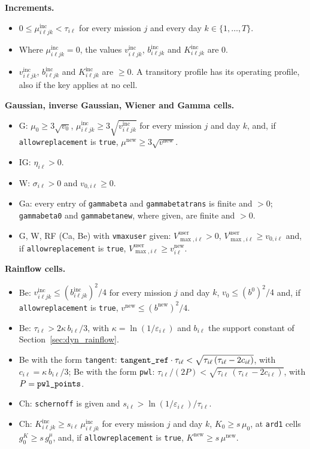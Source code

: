 \documentclass[11pt,a4paper]{article}
\theoremstyle{plain}
\theoremstyle{definition}
\newcommand{\inc}{\mathrm{inc}}
\newcommand{\new}{\mathrm{new}}
\renewcommand{\_}{\textunderscore\allowbreak{}}
\begin{document}
\textbf{Increments.}
\begin{itemize}[leftmargin=1.5em]
  \item $0 \le \mu^{\inc}_{i\ell jk} < \tau_{i\ell}$ for every mission $j$ and every day $k \in \{1,\ldots,T\}$.
  \item Where $\mu^{\inc}_{i\ell jk} = 0$, the values $v^{\inc}_{i\ell jk}$, $b^{\inc}_{i\ell jk}$ and $K^{\inc}_{i\ell jk}$ are $0$.
  \item $v^{\inc}_{i\ell jk}$, $b^{\inc}_{i\ell jk}$ and $K^{\inc}_{i\ell jk}$ are $\ge 0$. A transitory profile has its operating profile, also if the key applies at no cell.
\end{itemize}

\textbf{Gaussian, inverse Gaussian, Wiener and Gamma cells.}
\begin{itemize}[leftmargin=1.5em]
  \item G: $\mu_0 \ge 3\sqrt{v_0}$, $\mu^{\inc}_{i\ell jk} \ge 3\sqrt{v^{\inc}_{i\ell jk}}$ for every mission $j$ and day $k$, and, if \texttt{allow\_replacement} is \texttt{true}, $\mu^{\new} \ge 3\sqrt{v^{\new}}$.
  \item IG: $\eta_{i\ell} > 0$.
  \item W: $\sigma_{i\ell} > 0$ and $v_{0,i\ell} \ge 0$.
  \item Ga: every entry of \texttt{gamma\_beta} and \texttt{gamma\_beta\_trans} is finite and $> 0$; \texttt{gamma\_beta\_0} and \texttt{gamma\_beta\_new}, where given, are finite and $> 0$.
  \item G, W, RF (Ca, Be) with \texttt{v\_max\_user} given: $V^{\mathrm{user}}_{\max,i\ell} > 0$, $V^{\mathrm{user}}_{\max,i\ell} \ge v_{0,i\ell}$ and, if \texttt{allow\_replacement} is \texttt{true}, $V^{\mathrm{user}}_{\max,i\ell} \ge v^{\new}_{i\ell}$.
\end{itemize}

\textbf{Rainflow cells.}
\begin{itemize}[leftmargin=1.5em]
  \item Be: $v^{\inc}_{i\ell jk} \le (b^{\inc}_{i\ell jk})^2/4$ for every mission $j$ and day $k$, $v_{0} \le (b^{0})^2/4$ and, if \texttt{allow\_replacement} is \texttt{true}, $v^{\new} \le (b^{\new})^2/4$.
  \item Be: $\tau_{i\ell} > 2\kappa\, b_{i\ell}/3$, with $\kappa = \ln(1/\varepsilon_{i\ell})$ and $b_{i\ell}$ the support constant of Section~\ref{sec:dyn_rainflow}.
  \item Be with the form \texttt{tangent}: $\texttt{tangent\_ref}\cdot\tau_{i\ell} < \sqrt{\tau_{i\ell}\,(\tau_{i\ell} - 2c_{i\ell})}$, with $c_{i\ell} = \kappa\, b_{i\ell}/3$; Be with the form \texttt{pwl}: $\tau_{i\ell}/(2P) < \sqrt{\tau_{i\ell}\,(\tau_{i\ell} - 2c_{i\ell})}$, with $P = \texttt{pwl\_points}$.
  \item Ch: \texttt{s\_chernoff} is given and $s_{i\ell} > \ln(1/\varepsilon_{i\ell})/\tau_{i\ell}$.
  \item Ch: $K^{\inc}_{i\ell jk} \ge s_{i\ell}\,\mu^{\inc}_{i\ell jk}$ for every mission $j$ and day $k$, $K_{0} \ge s\,\mu_{0}$, at \texttt{ard1} cells $g^{K}_{0} \ge s\,g^{\mu}_{0}$, and, if \texttt{allow\_replacement} is \texttt{true}, $K^{\new} \ge s\,\mu^{\new}$.
\end{itemize}
\end{document}
